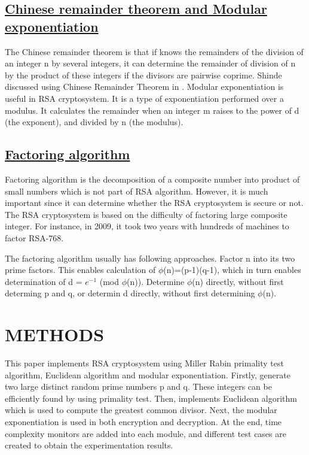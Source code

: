 \documentclass[12pt, oneside]{book}
\begin{document}
\section{\underline{Chinese remainder theorem and Modular exponentiation}}
The Chinese remainder theorem is that if knows the remainders of the division of an integer n by several integers, it can determine the remainder of division of n by the product of these integers if the divisors are pairwise coprime. Shinde discussed using Chinese Remainder Theorem in \cite{shinde2008faster}. Modular exponentiation \cite{zhong2000modular} is useful in RSA cryptosystem. It is a type of exponentiation performed over a modulus. It calculates the remainder when an integer m raises to the power of d (the exponent), and divided by n (the modulus).

\section{\underline{Factoring algorithm}}
Factoring algorithm is the decomposition of a composite number into product of small numbers which is not part of RSA algorithm. However, it is much important since it can determine whether the RSA cryptosystem is secure or not. The RSA cryptosystem is based on the difficulty of factoring large composite integer. For instance, in 2009, it took two years with hundreds of machines to factor RSA-768.\par
The factoring algorithm usually has following approaches. Factor n into its two prime factors. This enables calculation of $\phi$(n)=(p-1)(q-1), which in turn enables determination of d = $e^{-1}$ (mod $\phi$(n)). Determine $\phi$(n) directly, without first determing p and q, or determin d directly, without first determining $\phi$(n).


\chapter{\textbf{METHODS}}
This paper implements RSA cryptosystem using Miller Rabin primality test algorithm, Euclidean algorithm and modular exponentiation. Firstly, generate two large distinct random prime numbers p and q. These integers can be efficiently found by using primality test. Then, implements Euclidean algorithm which is used to compute the greatest common divisor. Next, the modular exponentiation is used in both encryption and decryption. At the end, time complexity monitors are added into each module, and different test cases are created to obtain the experimentation results.
\end{document}

